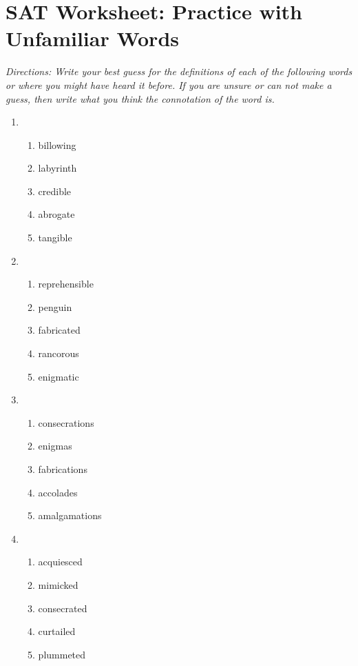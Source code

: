 \section{SAT Worksheet: Practice with Unfamiliar Words}

\textit{Directions: Write your best guess for the definitions of each of the following words or where you might have heard it before. If you are unsure or can not make a guess, then write what you think the connotation of the word is.} 


\begin{enumerate}

\item   
\begin{enumerate}[label=(\Alph*)]
\item billowing  \hrulefill
\item labyrinth \hrulefill
\item credible \hrulefill
\item abrogate \hrulefill
\item tangible \hrulefill
\end{enumerate}

\item    
\begin{enumerate}[label=(\Alph*)] 
\item reprehensible \hrulefill
\item penguin  \hrulefill
\item fabricated \hrulefill
\item rancorous \hrulefill
\item enigmatic   \hrulefill
\end{enumerate}

\item 
\begin{enumerate} [label=(\Alph*)]
\item consecrations \hrulefill
\item enigmas \hrulefill
\item fabrications \hrulefill
\item accolades \hrulefill
\item amalgamations  \hrulefill
\end{enumerate}

\item 
\begin{enumerate} [label=(\Alph*)]
\item acquiesced \hrulefill
\item mimicked  \hrulefill
\item consecrated \hrulefill
\item curtailed \hrulefill
\item plummeted \hrulefill
\end{enumerate}

\end{enumerate}


